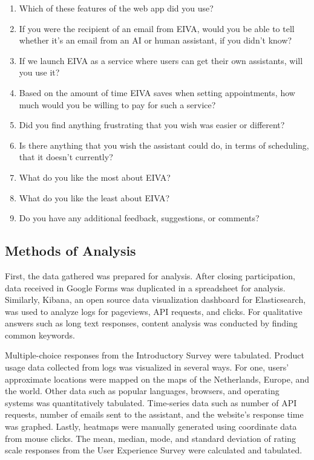 \documentclass{article}
\begin{document}
\begin{enumerate}
	\item Which of these features of the web app did you use?
	\item If you were the recipient of an email from EIVA, would you be able to tell whether it's an email from an AI or human assistant, if you didn't know?
	\item If we launch EIVA as a service where users can get their own assistants, will you use it?
	\item Based on the amount of time EIVA saves when setting appointments, how much would you be willing to pay for such a service?
	\item Did you find anything frustrating that you wish was easier or different?
	\item Is there anything that you wish the assistant could do, in terms of scheduling, that it doesn't currently?
	\item What do you like the most about EIVA?
	\item What do you like the least about EIVA?
	\item Do you have any additional feedback, suggestions, or comments?
\end{enumerate}

\subsection{Methods of Analysis}

First, the data gathered was prepared for analysis. After closing participation, data received in Google Forms was duplicated in a spreadsheet for analysis. Similarly, Kibana, an open source data visualization dashboard for Elasticsearch, was used to analyze logs for pageviews, API requests, and clicks. For qualitative answers such as long text responses, content analysis was conducted by finding common keywords.

Multiple-choice responses from the Introductory Survey were tabulated. Product usage data collected from logs was visualized in several ways. For one, users' approximate locations were mapped on the maps of the Netherlands, Europe, and the world. Other data such as popular languages, browsers, and operating systems was quantitatively tabulated. Time-series data such as number of API requests, number of emails sent to the assistant, and the website's response time was graphed. Lastly, heatmaps were manually generated using coordinate data from mouse clicks. The mean, median, mode, and standard deviation of rating scale responses from the User Experience Survey were calculated and tabulated.
\end{document}
